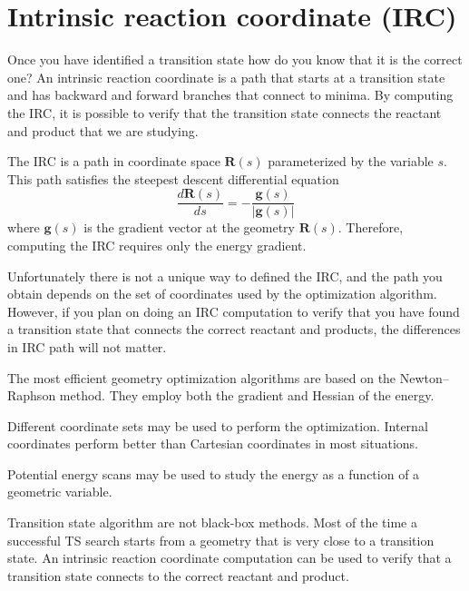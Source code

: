 \documentclass[../Main/chem371-notes.tex]{subfiles}
\begin{document}
\section{Intrinsic reaction coordinate (IRC)}

Once you have identified a transition state how do you know that it is the correct one?
An intrinsic reaction coordinate is a path that starts at a transition state and has backward  and forward branches that connect to minima.
By computing the IRC, it is possible to verify that the transition state connects the reactant and product that we are studying.

The IRC is a path in coordinate space $\mathbf{R}(s)$ parameterized by the variable $s$.
This path satisfies the steepest descent differential equation
\begin{equation}
\frac{ d \mathbf{R}(s) }{ d s} = - \frac{\mathbf{g}(s)}{|\mathbf{g}(s)|}
\end{equation}
where $\mathbf{g}(s)$ is the gradient vector at the geometry $\mathbf{R}(s)$.
Therefore, computing the IRC requires only the energy gradient.

Unfortunately there is not a unique way to defined the IRC, and the path you obtain depends on the set of coordinates used by the optimization algorithm.
However, if you plan on doing an IRC computation to verify that you have found a transition state that connects the correct reactant and products, the differences in IRC path will not matter.

\begin{summary}
\item The most efficient geometry optimization algorithms are based on the Newton--Raphson method. They employ both the gradient and Hessian of the energy.
\item Different coordinate sets may be used to perform the optimization. Internal coordinates perform better than Cartesian coordinates in most situations.
\item Potential energy scans may be used to study the energy as a function of a geometric variable.
\item Transition state algorithm are not black-box methods. Most of the time a successful TS search starts from a geometry that is very close to a transition state.
An intrinsic reaction coordinate computation can be used to verify that a transition state connects to the correct reactant and product.
\end{summary}
\end{document}
